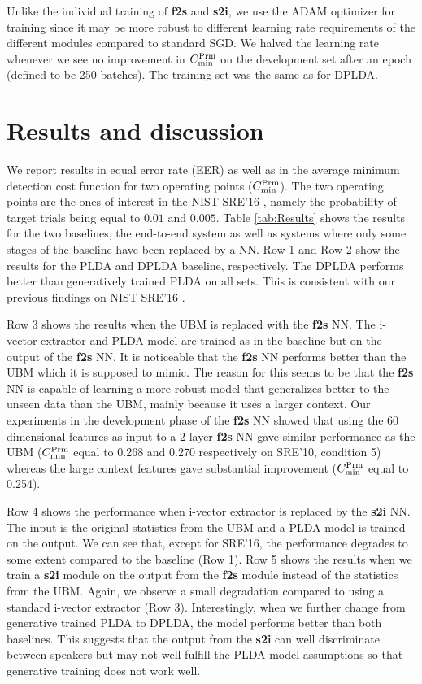 \documentclass{article}
\begin{document}
Unlike the individual training of {\bf f2s} and {\bf s2i}, we use the ADAM optimizer \cite{DBLP:journals/corr/KingmaB14} for training since it may be more robust to different learning rate requirements of the different modules compared to standard SGD. We halved the learning rate whenever we see no improvement in $C^{\rm Prm}_{\rm min}$ on the development set after an epoch (defined to be 250 batches). The training set was the same as for DPLDA.


\section{Results and discussion}
\label{experiments}

We report results in equal error rate (EER) as well as in the average minimum detection cost function for two operating points ($C^{\rm Prm}_{\rm min}$). The two operating points are
the ones of interest in the NIST SRE'16 \cite{NIST_SRE_2016}, namely the probability of target trials being equal to $0.01$ and $0.005$. Table \ref{tab:Results} shows the results for the two baselines, the end-to-end system as well as systems where only some stages of the baseline have been replaced by a NN.
Row 1 and Row 2 show the results for the PLDA and DPLDA baseline, respectively. The DPLDA performs better than generatively trained PLDA on all sets. This is consistent with our previous findings on NIST SRE'16 \cite{Interspeech2017:Plchot}. 

Row 3 shows the results when the UBM is replaced with the {\bf f2s} NN. The i-vector extractor and PLDA model are trained as in the baseline but on the output of the {\bf f2s} NN. It is noticeable that the {\bf f2s} NN performs better than the UBM which it is supposed to mimic. The reason for this seems to be that the {\bf f2s} NN is capable of learning a more robust model that generalizes better to the unseen data than the UBM, mainly because it uses a larger context. Our experiments in the development phase of the {\bf f2s} NN showed that using the 60 dimensional features as input to a 2 layer {\bf f2s} NN gave similar performance as the UBM ($C^{\rm Prm}_{\rm min}$ equal to 0.268 and 0.270 respectively on SRE'10, condition 5) whereas the large context features gave substantial improvement ($C^{\rm Prm}_{\rm min}$ equal to 0.254). 

Row 4 shows the performance when i-vector extractor is replaced by the {\bf s2i} NN. The input is the original statistics from the UBM and a PLDA model is trained on the output. We can see that, except for SRE'16, the performance degrades to some extent compared to the baseline (Row 1).  
Row 5 shows the results when we train a {\bf s2i} module on the output from the {\bf f2s} module instead of the statistics from the UBM. Again, we observe a small degradation compared to using a standard i-vector extractor (Row 3). Interestingly, when we further change from generative trained PLDA to DPLDA, the model performs better than both baselines. This suggests that the output from the {\bf s2i} can well discriminate between speakers but may not well fulfill the PLDA model assumptions so that generative training does not work well. 
\end{document}
